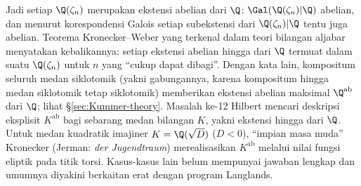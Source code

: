 Jadi setiap $\Q(\zeta_n)$ merupakan ekstensi abelian dari $\Q$: $\Gal(\Q(\zeta_n)|\Q)$ abelian, dan menurut korespondensi Galois setiap subekstensi dari $\Q(\zeta_n)|\Q$ tentu juga abelian. Teorema Kronecker--Weber yang terkenal dalam teori bilangan aljabar menyatakan kebalikannya: setiap ekstensi abelian hingga dari $\Q$ termuat dalam suatu $\Q(\zeta_n)$ untuk $n$ yang ``cukup dapat dibagi''. Dengan kata lain, kompositum seluruh medan siklotomik (yakni gabungannya, karena kompositum hingga medan siklotomik tetap siklotomik) memberikan ekstensi abelian maksimal $\Q^{\text{ab}}$ dari $\Q$; lihat \S\ref{sec:Kummer-theory}. Masalah ke-12 Hilbert mencari deskripsi eksplisit $K^\text{ab}$ bagi sebarang medan bilangan $K$, yakni ekstensi hingga dari $\Q$. Untuk medan kuadratik imajiner $K = \Q(\sqrt{D})$ ($D < 0$), ``impian masa muda'' Kronecker (Jerman: \textit{der Jugendtraum}) merealisasikan $K^\text{ab}$ melalui nilai fungsi eliptik pada titik torsi. Kasus-kasus lain belum mempunyai jawaban lengkap dan umumnya diyakini berkaitan erat dengan program Langlands.

